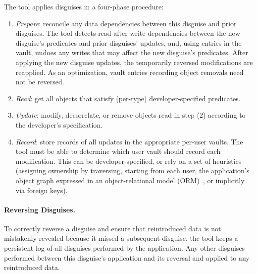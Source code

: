 The tool applies disguises in a four-phase procedure:
\begin{enumerate}
    \item \emph{Prepare}: reconcile any data dependencies between this disguise and prior disguises.
            The tool detects read-after-write dependencies between the new disguise's predicates and prior disguises'
            updates, and, using entries in the vault, undoes any writes that may affect the new disguise's predicates. After
            applying the new disguise updates, the temporarily reversed modifications are reapplied. As an
            optimization, vault entries recording object removals need not be reversed.
        \item \emph{Read}: get all objects that satisfy (per-type) developer-specified predicates.
        \item \emph{Update}: modify, decorrelate, or remove objects read in step (2) according to the
        developer's specification.
    \item \emph{Record}: store records of all updates in the appropriate per-user vaults. The tool
        must be able to determine which user vault should record each modification. This can be
        developer-specified, or rely on a set of heuristics (\eg assigning ownership by traversing,
        starting from each user, the application's object graph expressed in an object-relational
        model (ORM)~\cite{orm}, or implicitly via foreign keys). 

\end{enumerate}

\paragraph{Reversing Disguises.}
To correctly reverse a disguise and ensure that reintroduced data is not mistakenly revealed because
it missed a subsequent disguise, the tool keeps a persistent log of all disguises performed by the 
application. Any other disguises performed between this disguise's application and its reversal and
applied to any reintroduced data.
